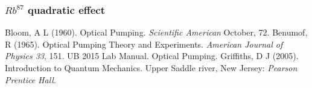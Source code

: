 \documentclass[twocolumn]{article}
\begin{document}
\subsubsection{$Rb^{87}$ quadratic effect}


\begin{thebibliography}{9}
Bloom, A L (1960). Optical Pumping. \emph{Scientific American} October, 72.
Benumof, R (1965). Optical Pumping Theory and Experiments. \emph{American 
Journal of Physics 33}, 151.
UB 2015 Lab Manual. Optical Pumping.
Griffiths, D J (2005). Introduction to Quantum Mechanics. Upper Saddle river, 
New Jersey: \emph{Pearson Prentice Hall}.

\end{thebibliography}
\end{document}
